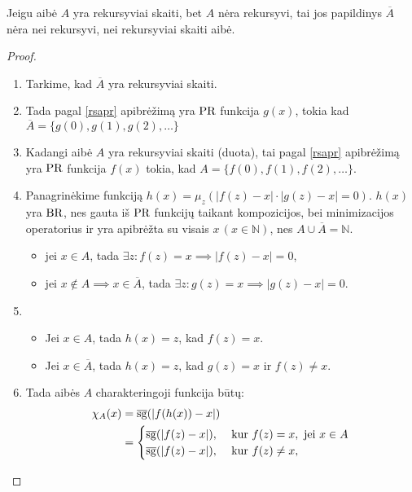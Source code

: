 \begin{prop}
  Jeigu aibė $A$ yra rekursyviai skaiti, bet $A$ nėra rekursyvi, tai
  jos papildinys $\overline{A}$ nėra nei rekursyvi, nei rekursyviai
  skaiti aibė.
  \begin{proof}
    \hfill \\
    \begin{enumerate}
      \item Tarkime, kad $\overline{A}$ yra rekursyviai skaiti.
      \item Tada pagal \ref{rsapr} apibrėžimą yra $\mathop{\text{PR}}$ funkcija
        $g(x)$, tokia kad $\overline{A} = \{g(0), g(1), g(2), \dotsc \}$
      \item Kadangi aibė $A$ yra rekursyviai skaiti (duota), tai 
        pagal \ref{rsapr} apibrėžimą yra $\mathop{\text{PR}}$ funkcija $f(x)$ tokia, kad
        $A = \{ f(0), f(1), f(2), \dotsc \}$.
      \item Panagrinėkime funkciją 
        $h(x) = \mu_{z}(|f(z)-x| \cdot |g(z)-x|=0)$. $h(x)$ yra
        $\mathop{\text{BR}}$, nes gauta iš $\mathop{\text{PR}}$ funkcijų taikant kompozicijos, bei
        minimizacijos operatorius ir yra apibrėžta su visais 
        $x \, (x \in \mathbb{N})$, nes $A \cup \overline{A} = \mathbb{N}$.
        \begin{itemize}
          \item jei $x \in A$, tada 
            $\exists z: f(z) = x \implies |f(z) - x| = 0$,
          \item jei $x \not \in A \implies x \in \overline{A}$, tada
            $\exists z: g(z) = x \implies |g(z) - x| = 0$.
        \end{itemize}
      \item 
        \begin{itemize}
          \item Jei $x \in A$, tada $h(x) = z$, kad $f(z) = x$.
          \item Jei $x \in \overline{A}$, tada $h(x) = z$, kad 
            $g(z) = x$ ir $f(z) \neq x$.
        \end{itemize}
      \item Tada aibės $A$ charakteringoji funkcija būtų:
        \begin{align*}
          \chi_{A}(x) &= \sgi(|f(h(x)) - x|) \\
          &=%
          \begin{cases}
            \sgi(|f(z) - x|), & \text{ kur } f(z) = x, %
              \text{ jei } x \in A\\
            \sgi(|f(z) - x|), & \text{ kur } f(z) \neq x, %

\end{cases}
\end{align*}
\end{enumerate}
\end{proof}
\end{prop}
